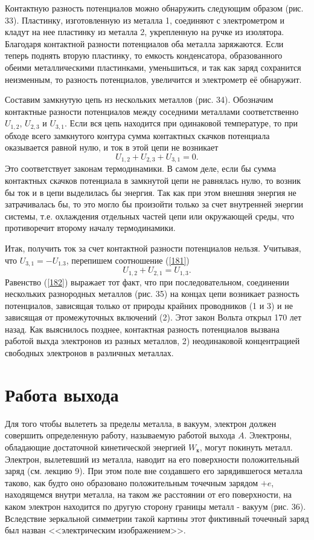 \documentclass[a4paper,10pt]{book}
\begin{document}
Контактную разность потенциалов можно обнаружить следующим образом (рис. 33). Пластинку, изготовленную из металла 1, соединяют с электрометром и кладут на нее пластинку из металла 2, укрепленную на ручке из изолятора. Благодаря контактной разности потенциалов оба металла заряжаются. Если теперь поднять вторую пластинку, то емкость конденсатора, образованного обеими металлическими пластинками, уменьшиться, и так как заряд сохранится неизменным, то разность потенциалов, увеличится и электрометр её обнаружит.

Составим замкнутую цепь нз нескольких металлов (рис. 34). Обозначим контактные разности потенциалов между соседними металлами соответственно $U_{1,2}$, $U_{2,3}$ и $U_{3,1}$. Если вся цепь находится при одинаковой температуре, то при обходе всего замкнутого контура сумма контактных скачков потенциала оказывается равной нулю, и ток в этой цепи не возникает 
\begin{equation}\label{181}
 U_{1,2} + U_{2,3} + U_{3,1} = 0.
\end{equation}
Это соответствует законам термодинамики. В самом деле, если бы сумма контактных скачков потенциала в замкнутой цепи не равнялась нулю, то возник бы ток и в цепи выделилась бы энергия. Так как при этом внешняя энергия не затрачивалась бы, то это могло бы произойти только за счет внутренней энергии системы, т.е. охлаждения отдельных частей цепи или окружающей среды, что противоречит второму началу термодинамики.

Итак, получить ток за счет контактной разности потенциалов нельзя. Учитывая, что $U_{3,1} = -U_{1.3}$, перепишем соотношение (\ref{181})
\begin{equation}\label{182}
 U_{1,2} + U_{2,1} = U_{1,3}.
\end{equation}
Равенство (\ref{182}) выражает тот факт, что при последовательном, соединении нескольких разнородных металлов (рис. 35) на концах цепи возникает разность потенциалов, зависящая только от природы крайних проводников (1 и 3) и не зависящая от промежуточных включений (2). Этот закон Вольта открыл 170 лет назад. Как выяснилось позднее, контактная разность потенциалов вызвана работой выхда электронов из разных металлов, 2) неодинаковой концентрацией свободных электронов в различных металлах.
\section{Работа выхода}
Для того чтобы вылететь за пределы металла, в вакуум, электрон должен совершить определенную работу, называемую работой выхода $A$. Электроны, обладающие достаточной кинетической энергией $W_\text{к}$, могут покинуть металл. Электрон, вылетевший из металла, наводит на его поверхности положительный заряд (см. лекцию 9). При этом поле вне создавшего его зарядившегося металла таково, как будто оно образовано положительным точечным зарядом $+e$, находящемся внутри металла, на таком же расстоянии от его поверхности, на каком электрон находится по другую сторону границы металл - вакуум (рис. 36). Вследствие зеркальной симметрии такой картины этот фиктивный точечный заряд был назван <<электрическим изображением>>.
\end{document}
